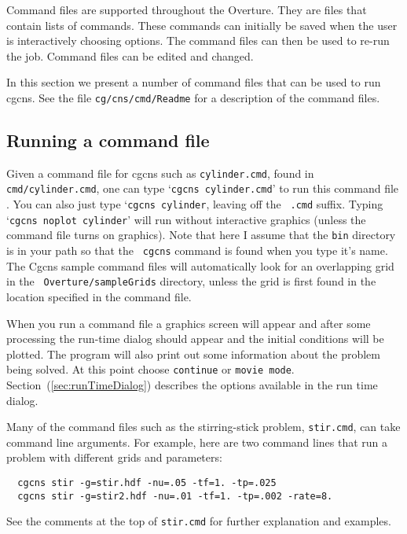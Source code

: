 \documentclass{article}
\newcommand{\Index}[1]{#1\index{#1}}
\begin{document}
Command files are supported throughout the Overture. They are files
that contain lists of commands. These commands can initially be saved
when the user is interactively choosing options.  The \Index{command files}
can then be used to re-run the job. Command files can be edited and
changed.

In this section we present a number of command files that can be used
to run cgcns. See the file {\tt cg/cns/cmd/Readme} for a description of
the command files. 

\subsection{Running a command file}

Given a \Index{command file} for cgcns such as {\tt cylinder.cmd}, found in {\tt
cmd/cylinder.cmd}, one can type `{\tt cgcns cylinder.cmd}' to run this command
file . You can also just type `{\tt cgcns cylinder}, leaving off the {\tt
.cmd} suffix. Typing `{\tt cgcns noplot cylinder}' will run without
interactive graphics (unless the command file turns on graphics). Note that here
I assume that the {\tt bin} directory is in your path so that the {\tt
cgcns} command is found when you type it's name. The Cgcns sample
command files will automatically look for an overlapping grid in the {\tt
Overture/sampleGrids} directory, unless the grid is first found in the location
specified in the command file.

When you run a command file a graphics screen will appear and after some
processing the run-time dialog should appear and the initial conditions will be
plotted. The program will also print out some information about the problem
being solved. At this point choose {\tt continue} or {\tt movie
mode}. Section~(\ref{sec:runTimeDialog}) describes the options available in the
run time dialog.

Many of the command files such as the stirring-stick problem, {\tt stir.cmd},
can take command line arguments.  For example, here
are two command lines that run a problem with different grids and parameters:
\begin{verbatim}
  cgcns stir -g=stir.hdf -nu=.05 -tf=1. -tp=.025 
  cgcns stir -g=stir2.hdf -nu=.01 -tf=1. -tp=.002 -rate=8.
\end{verbatim}
See the comments at the top of {\tt stir.cmd} for further explanation and examples.
\end{document}
